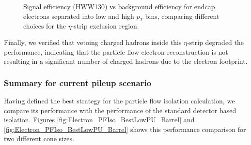  
\begin{figure}[!htbp]
\begin{center}
\caption{Signal efficiency (HWW130) vs background efficiency for endcap electrons separated into 
low and high $p_{T}$ bins, comparing different choices for the $\eta$-strip exclusion region.}
\label{fig:IsoPerformance_Electron_PFIso_VetoStripChoices_Endcap}
\end{center}
\end{figure}

Finally, we verified that vetoing charged hadrons inside this $\eta$-strip degraded the performance, 
indicating that the particle flow electron reconstruction is not resulting in a significant number
of charged hadrons due to the electron footprint.



\subsubsection{Summary for current pileup scenario}

Having defined the best strategy for the particle flow isolation calculation, we 
compare its performance with the performance of the standard detector based isolation.
Figures \ref{fig:Electron_PFIso_BestLowPU_Barrel} and 
\ref{fig:Electron_PFIso_BestLowPU_Barrel} shows this performance comparison for two 
different cone sizes. 

